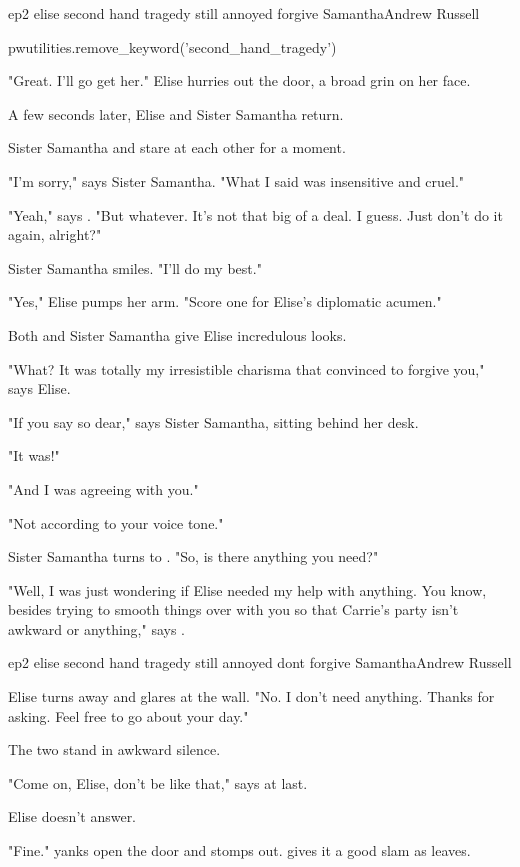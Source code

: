 \documentclass{book}
\begin{document}
\begin{childnode}{ep2 elise second hand tragedy still annoyed forgive Samantha}{Andrew Russell}

    \begin{code}

        pwutilities.remove\_keyword('second\_hand\_tragedy')

    \end{code}

    "Great. I'll go get her." Elise hurries out the door, a broad grin on her face.

    A few seconds later, Elise and Sister Samantha return.

    Sister Samantha and \name{} stare at each other for a moment.

    "I'm sorry," says Sister Samantha. "What I said was insensitive and cruel."

    "Yeah," says \name{}. "But whatever. It's not that big of a deal. I guess. Just don't do it again, alright?"

    Sister Samantha smiles. "I'll do my best."

    "Yes," Elise pumps her arm. "Score one for Elise's diplomatic acumen."

    Both \name{} and Sister Samantha give Elise incredulous looks.

    "What? It was totally my irresistible charisma that convinced \name{} to forgive you," says Elise.

    "If you say so dear," says Sister Samantha, sitting behind her desk.

    "It was!"

    "And I was agreeing with you."

    "Not according to your voice tone."

    Sister Samantha turns to \name{}. "So, is there anything you need?"

    "Well, I was just wondering if Elise needed my help with anything. You know, besides trying to smooth things over with you so that Carrie's party isn't awkward or anything," says \name{}.


\end{childnode}

\begin{childnode}{ep2 elise second hand tragedy still annoyed dont forgive Samantha}{Andrew Russell}


    Elise turns away and glares at the wall. "No. I don't need anything. Thanks for asking. Feel free to go about your day."

    The two stand in awkward silence.

    "Come on, Elise, don't be like that," says \name{} at last.

    Elise doesn't answer.

    "Fine." \name{} yanks open the door and stomps out. \HeShe{} gives it a good slam as \heshe{} leaves.

\end{childnode}
\end{document}
